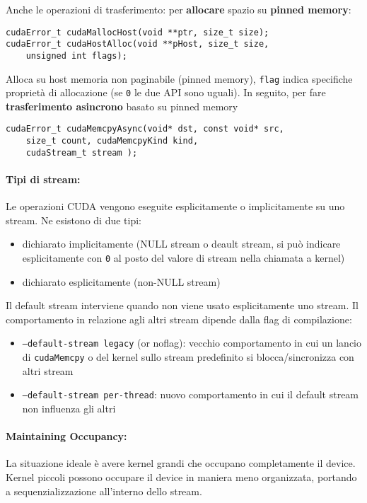 Anche le operazioni di trasferimento: per \textbf{allocare} spazio su \textbf{pinned memory}:
\begin{verbatim}
cudaError_t cudaMallocHost(void **ptr, size_t size);
cudaError_t cudaHostAlloc(void **pHost, size_t size, 
    unsigned int flags);
\end{verbatim}

Alloca su host memoria non paginabile (pinned memory), \texttt{flag} indica specifiche proprietà di allocazione (se \texttt{0} le due API sono uguali). In seguito, per fare \textbf{trasferimento asincrono} basato su pinned memory
\begin{verbatim}
cudaError_t cudaMemcpyAsync(void* dst, const void* src, 
    size_t count, cudaMemcpyKind kind, 
    cudaStream_t stream );
\end{verbatim}

\paragraph{Tipi di stream:} Le operazioni CUDA vengono eseguite esplicitamente o implicitamente su uno stream. Ne esistono di due tipi: 
\begin{itemize}
	\item dichiarato implicitamente (NULL stream o deault stream, si può indicare esplicitamente con \texttt{0} al posto del valore di stream nella chiamata a kernel)
	
	\item dichiarato esplicitamente (non-NULL stream)
\end{itemize}

Il default stream interviene quando non viene usato esplicitamente uno stream. Il comportamento in relazione agli altri stream dipende dalla flag di compilazione:
\begin{itemize}
	\item \texttt{--default-stream legacy} (or noflag): vecchio comportamento in cui un lancio di \texttt{cudaMemcpy} o del kernel sullo stream predefinito si blocca/sincronizza con altri stream
	
	\item \texttt{--default-stream per-thread}: nuovo comportamento in cui il default stream non influenza gli altri
\end{itemize}

\paragraph{Maintaining Occupancy:} La situazione ideale è avere kernel grandi che occupano completamente il device. Kernel piccoli possono occupare il device in maniera meno organizzata, portando a sequenzializzazione all'interno dello stream.

